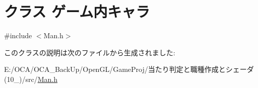 \hypertarget{class_xE3_x82_xB2_xE3_x83_xBC_xE3_x83_xA0_xE5_x86_x85_xE3_x82_xAD_xE3_x83_xA3_xE3_x83_xA9}{\section{クラス ゲーム内キャラ}
\label{class_xE3_x82_xB2_xE3_x83_xBC_xE3_x83_xA0_xE5_x86_x85_xE3_x82_xAD_xE3_x83_xA3_xE3_x83_xA9}
}


{\ttfamily \#include $<$Man.\-h$>$}



このクラスの説明は次のファイルから生成されました\-:\begin{DoxyCompactItemize}
\item 
E\-:/\-O\-C\-A/\-O\-C\-A\-\_\-\-Back\-Up/\-Open\-G\-L/\-Game\-Proj/当たり判定と職種作成とシェーダ(10\-\_)/src/\hyperlink{_man_8h}{Man.\-h}\end{DoxyCompactItemize}
